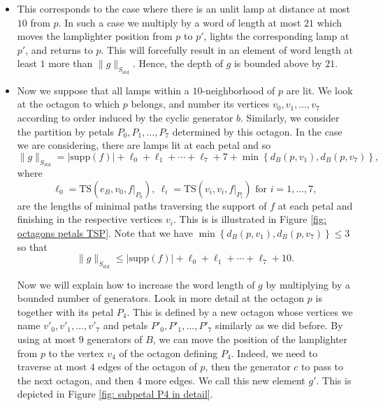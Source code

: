 \documentclass[reqno,oneside]{amsart}
\newcommand{\Z}{\mathbb{Z}}
\newcommand{\supp}[1]{\mathrm{supp}(#1)}
\newcommand{\std}{S_{\mathrm{std}}}
\newcommand{\TS}[3]{\mathrm{TS}\left(#1,#2,#3\right)}
\theoremstyle{plain}
\theoremstyle{definition}
\begin{document}
\begin{itemize}
	
	\item[\textbf{First case: there exists $p'\in B_{S_B}(p,10)$ with $f(p')=e_{\Z/2\Z}$}.]  This corresponds to the case where there is an unlit lamp at distance at most $10$ from $p$. In such a case we multiply by a word of length at most $21$ which moves the lamplighter position from $p$ to $p'$, lights the corresponding lamp at $p'$, and returns to $p$. This will forcefully result in an element of word length at least $1$ more than $\|g\|_{\std}$. Hence, the depth of $g$ is bounded above by $21$.
	
	\item[\textbf{Second case: $f(p')=a$ for all $p'\in B_{S_B}(p,10)$.}] 
	
	
	Now we suppose that all lamps within a $10$-neighborhood of $p$ are lit. We look at the octagon to which $p$ belongs, and number its vertices $v_0,v_1,\ldots,v_7$ according to order induced by the cyclic generator $b$. Similarly, we consider the partition by petals $P_0,P_1,\ldots,P_7$ determined by this octagon. In the case we are considering, there are lamps lit at each petal and so
	$$
	\|g\|_{\std}=\left|\supp{f}\right|+\ell_0+\ell_1+\cdots+\ell_7 +7 + \min\left\{ d_B(p,v_1),d_B(p,v_7)\right\},
	$$
	where 
	$$
	\ell_0=\TS{e_B}{v_0}{f|_{P_0}}, \ \ell_i=\TS{v_i}{v_i}{f|_{P_i}} \text{  for  } i=1,\ldots,7,
	$$
	are the lengths of minimal paths traversing the support of $f$ at each petal and finishing in the respective vertices $v_i$. This is is illustrated in Figure \ref{fig: octagons petals TSP}. Note that we have $\min\left\{ d_B(p,v_1),d_B(p,v_7)\right\}\le 3$ so that
	$$\|g\|_{\std}\le\left|\supp{f}\right|+\ell_0+\ell_1+\cdots+\ell_7 +10.
	$$
	
	\begin{figure*}[h!]
		\centering
		
		\caption{An optimal path for $g$ must visit all petals and return to $p$.}
		\label{fig: octagons petals TSP}
	\end{figure*}
	
	Now we will explain how to increase the word length of $g$ by multiplying by a bounded number of generators. Look in more detail at the octagon $p$ is together with its petal $P_4$. This is defined by a new octagon whose vertices we name $v'_0,v'_1,\ldots,v'_7$ and petals $P'_0,P'_1,\ldots,P'_7$ similarly as we did before. By using at most $9$ generators of $B$, we can move the position of the lamplighter from $p$ to the vertex $v_4$ of the octagon defining $P_4$. Indeed, we need to traverse at most $4$ edges of the octagon of $p$, then the generator $c$ to pass to the next octagon, and then $4$ more edges. We call this new element $g'$. This is depicted in Figure \ref{fig: subpetal P4 in detail}.
	\begin{figure*}[h!]
		\centering
		
		\caption{The new position $p'$ of the lamplighter for the element $g'$, with $d_{\std}(g,g')\le 9$.}
		\label{fig: subpetal P4 in detail}
	\end{figure*}
	

\end{itemize}
\end{document}
